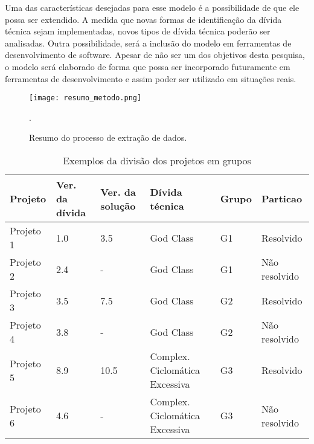 Uma das características desejadas para esse modelo é a possibilidade de que ele possa ser extendido.  A medida que novas formas de identificação da dívida técnica sejam implementadas, novos tipos de dívida técnica poderão ser analisadas. Outra possibilidade, será a inclusão do modelo em ferramentas de desenvolvimento de software. Apesar de não ser um dos objetivos desta pesquisa, o modelo será elaborado de forma que possa ser incorporado futuramente em ferramentas de desenvolvimento e assim poder ser utilizado em situações reais.





\begin{figure}[!h]
  \centering
  \texttt{[image: resumo\_metodo.png]} 
  \caption{Resumo do processo de extração de dados. }.
  \label{fig:resumo_metodo} 
\end{figure}




\begin{table}[!h]

\caption{Exemplos da divisão dos projetos em grupos}
\label{table:exemploGrupos}
\def\arraystretch{1.1}%
\begin{tabular}{|l|l|l|l|l|l|}
\hline
Projeto   & Ver. da dívida & Ver. da solução & Dívida técnica                     & Grupo & Particao      \\ \hline
Projeto 1 & 1.0              & 3.5               & God Class                          & G1    & Resolvido     \\ \hline
Projeto 2 & 2.4              & -                 & God Class                          & G1    & Não resolvido \\ \hline
Projeto 3 & 3.5              & 7.5               & God Class                          & G2    & Resolvido     \\ \hline
Projeto 4 & 3.8              & -                 & God Class                          & G2    & Não resolvido \\ \hline
Projeto 5 & 8.9              & 10.5              & Complex. Ciclomática Excessiva & G3    & Resolvido     \\ \hline
Projeto 6 & 4.6              & -                 & Complex. Ciclomática Excessiva & G3    & Não resolvido \\ \hline
\end{tabular}
\end{table}


